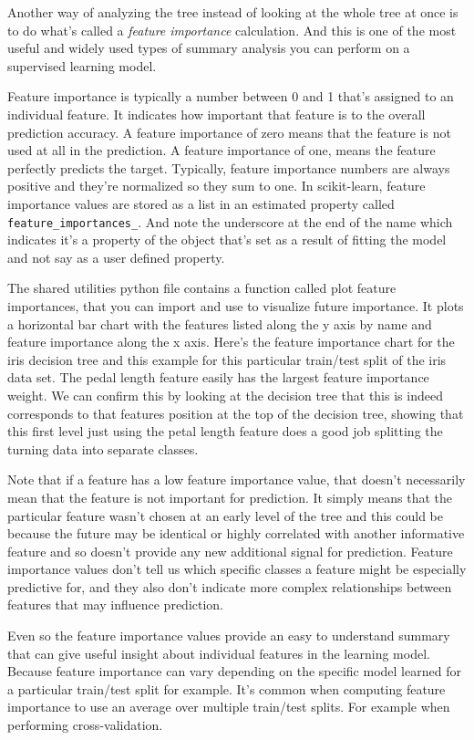 \begin{multicols}{2}
Another way of analyzing the tree instead of looking at the whole tree at once is to do what's called a \emph{feature importance} calculation. And this is one of the most useful and widely used types of summary analysis you can perform on a supervised learning model. 

Feature importance is typically a number between 0 and 1 that's assigned to an individual feature. It indicates how important that feature is to the overall prediction accuracy. A feature importance of zero means that the feature is not used at all in the prediction. A feature importance of one, means the feature perfectly predicts the target. Typically, feature importance numbers are always positive and they're normalized so they sum to one. In scikit-learn, feature importance values are stored as a list in an estimated property called \texttt{feature_importances_}. And note the underscore at the end of the name which indicates it's a property of the object that's set as a result of fitting the model and not say as a user defined property. 

The shared utilities python file contains a function called plot feature importances, that you can import and use to visualize future importance. It plots a horizontal bar chart with the features listed along the y axis by name and feature importance along the x axis. Here's the feature importance chart for the iris decision tree and this example for this particular train/test split of the iris data set. The pedal length feature easily has the largest feature importance weight. We can confirm this by looking at the decision tree that this is indeed corresponds to that features position at the top of the decision tree, showing that this first level just using the petal length feature does a good job splitting the turning data into separate classes. 

Note that if a feature has a low feature importance value, that doesn't necessarily mean that the feature is not important for prediction. It simply means that the particular feature wasn't chosen at an early level of the tree and this could be because the future may be identical or highly correlated with another informative feature and so doesn't provide any new additional signal for prediction. Feature importance values don't tell us which specific classes a feature might be especially predictive for, and they also don't indicate more complex relationships between features that may influence prediction. 

Even so the feature importance values provide an easy to understand summary that can give useful insight about individual features in the learning model. Because feature importance can vary depending on the specific model learned for a particular train/test split for example. It's common when computing feature importance to use an average over multiple train/test splits. For example when performing cross-validation. 


\end{multicols}
